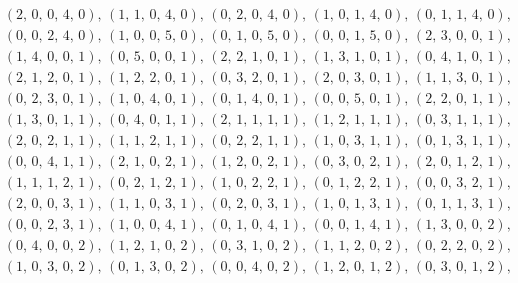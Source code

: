 \documentclass[12pt,reqno]{amsart}
\theoremstyle{definition}
\theoremstyle{remark}
\begin{document}
\begin{itemize}
{\begin{align*}
    &\left(2,\,0,\,0,\,4,\,0\right),\,\left(1,\,1,\,0,\,4,\,0\right),\,\left(0,\,2,\,0,\,4,\,0\right),\,\left(1,\,0,\,1,\,4,\,0\right),\,\left(0,\,1,\,1,\,4,\,0\right),\\
    &\left(0,\,0,\,2,\,4,\,0\right),\,\left(1,\,0,\,0,\,5,\,0\right),\,\left(0,\,1,\,0,\,5,\,0\right),\,\left(0,\,0,\,1,\,5,\,0\right),\,\left(2,\,3,\,0,\,0,\,1\right),\\
    &\left(1,\,4,\,0,\,0,\,1\right),\,\left(0,\,5,\,0,\,0,\,1\right),\,\left(2,\,2,\,1,\,0,\,1\right),\,\left(1,\,3,\,1,\,0,\,1\right),\,\left(0,\,4,\,1,\,0,\,1\right),\\
    &\left(2,\,1,\,2,\,0,\,1\right),\,\left(1,\,2,\,2,\,0,\,1\right),\,\left(0,\,3,\,2,\,0,\,1\right),\,\left(2,\,0,\,3,\,0,\,1\right),\,\left(1,\,1,\,3,\,0,\,1\right),\\
    &\left(0,\,2,\,3,\,0,\,1\right),\,\left(1,\,0,\,4,\,0,\,1\right),\,\left(0,\,1,\,4,\,0,\,1\right),\,\left(0,\,0,\,5,\,0,\,1\right),\,\left(2,\,2,\,0,\,1,\,1\right),\\
    &\left(1,\,3,\,0,\,1,\,1\right),\,\left(0,\,4,\,0,\,1,\,1\right),\,\left(2,\,1,\,1,\,1,\,1\right),\,\left(1,\,2,\,1,\,1,\,1\right),\,\left(0,\,3,\,1,\,1,\,1\right),\\
    &\left(2,\,0,\,2,\,1,\,1\right),\,\left(1,\,1,\,2,\,1,\,1\right),\,\left(0,\,2,\,2,\,1,\,1\right),\,\left(1,\,0,\,3,\,1,\,1\right),\,\left(0,\,1,\,3,\,1,\,1\right),\\
    &\left(0,\,0,\,4,\,1,\,1\right),\,\left(2,\,1,\,0,\,2,\,1\right),\,\left(1,\,2,\,0,\,2,\,1\right),\,\left(0,\,3,\,0,\,2,\,1\right),\,\left(2,\,0,\,1,\,2,\,1\right),\\
    &\left(1,\,1,\,1,\,2,\,1\right),\,\left(0,\,2,\,1,\,2,\,1\right),\,\left(1,\,0,\,2,\,2,\,1\right),\,\left(0,\,1,\,2,\,2,\,1\right),\,\left(0,\,0,\,3,\,2,\,1\right),\\
    &\left(2,\,0,\,0,\,3,\,1\right),\,\left(1,\,1,\,0,\,3,\,1\right),\,\left(0,\,2,\,0,\,3,\,1\right),\,\left(1,\,0,\,1,\,3,\,1\right),\,\left(0,\,1,\,1,\,3,\,1\right),\\
    &\left(0,\,0,\,2,\,3,\,1\right),\,\left(1,\,0,\,0,\,4,\,1\right),\,\left(0,\,1,\,0,\,4,\,1\right),\,\left(0,\,0,\,1,\,4,\,1\right),\,\left(1,\,3,\,0,\,0,\,2\right),\\
    &\left(0,\,4,\,0,\,0,\,2\right),\,\left(1,\,2,\,1,\,0,\,2\right),\,\left(0,\,3,\,1,\,0,\,2\right),\,\left(1,\,1,\,2,\,0,\,2\right),\,\left(0,\,2,\,2,\,0,\,2\right),\\
    &\left(1,\,0,\,3,\,0,\,2\right),\,\left(0,\,1,\,3,\,0,\,2\right),\,\left(0,\,0,\,4,\,0,\,2\right),\,\left(1,\,2,\,0,\,1,\,2\right),\,\left(0,\,3,\,0,\,1,\,2\right),\\

\end{align*}}
\end{itemize}
\end{document}
